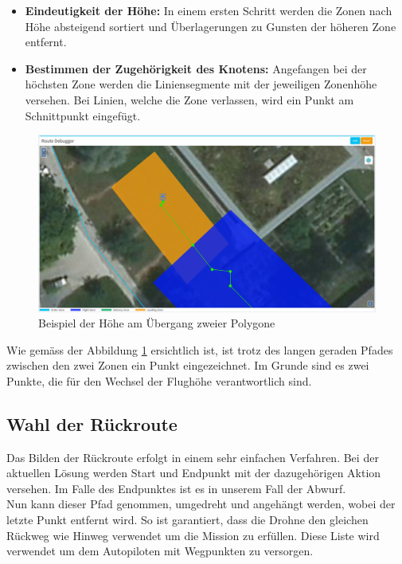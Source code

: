 \begin{itemize}
	\item{\textbf{Eindeutigkeit der Höhe:} In einem ersten Schritt werden die Zonen nach Höhe absteigend sortiert und Überlagerungen zu Gunsten der höheren Zone entfernt.}
	\item{\textbf{Bestimmen der Zugehörigkeit des Knotens:} Angefangen bei der höchsten Zone werden die Liniensegmente mit der jeweiligen Zonenhöhe versehen. Bei Linien, welche die Zone verlassen, wird ein Punkt am Schnittpunkt eingefügt.}
\end{itemize}
\begin{figure}[h]
	\centering
	\includegraphics[width=1.0\textwidth]{images/routing/height_example.png}
	\caption{Beispiel der Höhe am Übergang zweier Polygone}
	\label{fig:polygon-border-example}
\end{figure}
Wie gemäss der Abbildung \ref{fig:polygon-border-example} ersichtlich ist, ist trotz des langen geraden Pfades zwischen den zwei Zonen ein Punkt eingezeichnet. Im Grunde sind es zwei Punkte, die für den Wechsel der Flughöhe verantwortlich sind.
\newpage
\subsection{Wahl der Rückroute}
Das Bilden der Rückroute erfolgt in einem sehr einfachen Verfahren. Bei der aktuellen Lösung werden Start und Endpunkt mit der dazugehörigen Aktion versehen. Im Falle des Endpunktes ist es in unserem Fall der Abwurf.
\\
Nun kann dieser Pfad genommen, umgedreht und angehängt werden, wobei der letzte Punkt entfernt wird. So ist garantiert, dass die Drohne den gleichen Rückweg wie Hinweg verwendet um die Mission zu erfüllen. Diese Liste wird verwendet um dem Autopiloten mit Wegpunkten zu versorgen.
